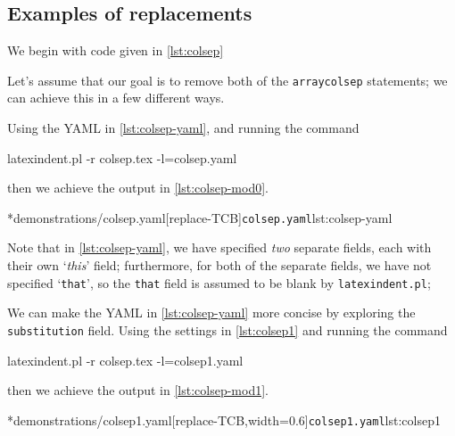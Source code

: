 \subsection{Examples of replacements}
	\begin{example}
		We begin with code given in \cref{lst:colsep}


		Let's assume that our goal is to remove both of the \texttt{arraycolsep} statements; we can achieve this in
		a few different ways.

		Using the YAML in \cref{lst:colsep-yaml}, and running the command
		\begin{commandshell}
latexindent.pl -r colsep.tex -l=colsep.yaml
\end{commandshell}
		then we achieve the output in \cref{lst:colsep-mod0}.
		\begin{cmhtcbraster}[raster column skip=.01\linewidth]
			\cmhlistingsfromfile*[style=yaml-LST]*{demonstrations/colsep.yaml}[replace-TCB]{\texttt{colsep.yaml}}{lst:colsep-yaml}
		\end{cmhtcbraster}
		Note that in \cref{lst:colsep-yaml}, we have specified \emph{two} separate fields, each with their own `\emph{this}' field;
		furthermore, for both of the separate fields, we have not specified `\texttt{that}', so the \texttt{that} field
		is assumed to be blank by \texttt{latexindent.pl};

		We can make the YAML in \cref{lst:colsep-yaml} more concise by exploring the \texttt{substitution} field. Using
		the settings in \cref{lst:colsep1} and running the command
		\begin{commandshell}
latexindent.pl -r colsep.tex -l=colsep1.yaml
\end{commandshell}
		then we achieve the output in \cref{lst:colsep-mod1}.
		\begin{cmhtcbraster}[raster column skip=.01\linewidth,
				raster force size=false,
				raster column 1/.style={add to width=-.1\textwidth}]
			\cmhlistingsfromfile*[style=yaml-LST]*{demonstrations/colsep1.yaml}[replace-TCB,width=0.6\textwidth]{\texttt{colsep1.yaml}}{lst:colsep1}
		\end{cmhtcbraster}


\end{example}

